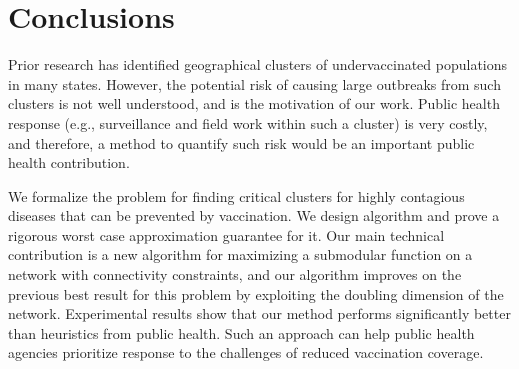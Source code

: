 \section{Conclusions}

Prior research has identified geographical clusters of undervaccinated
populations in many states. However, the potential risk of causing large outbreaks from such clusters is not well understood, and is the motivation of our work. Public health response (e.g., surveillance and field work within such a cluster) is very costly, and therefore, a method to quantify such risk would be an important public health contribution.


We formalize the problem \maxcrit{}
for finding critical clusters for highly contagious diseases that can be prevented by vaccination. 
We design algorithm \algomaxcrit{} and prove a rigorous worst case approximation guarantee for it. Our main technical contribution is a new algorithm for maximizing a submodular function on a network with connectivity constraints, and our algorithm improves on the previous best result for this problem by exploiting the doubling dimension of the network.
Experimental results show that our method performs significantly better than heuristics from public health. Such an approach can help public health agencies prioritize response to the challenges of reduced vaccination coverage.


